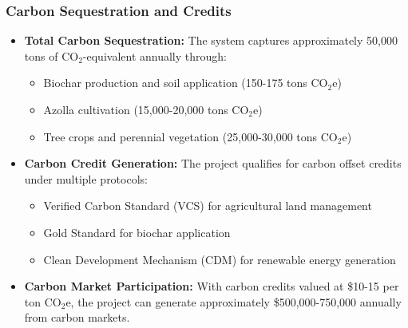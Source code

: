 \subsubsection{Carbon Sequestration and Credits}
\begin{itemize}
    \item \textbf{Total Carbon Sequestration:} The system captures approximately 50,000 tons of CO$_2$-equivalent annually through:
    \begin{itemize}
        \item Biochar production and soil application (150-175 tons CO$_2$e)
        \item Azolla cultivation (15,000-20,000 tons CO$_2$e)
        \item Tree crops and perennial vegetation (25,000-30,000 tons CO$_2$e)
    \end{itemize}
    
    \item \textbf{Carbon Credit Generation:} The project qualifies for carbon offset credits under multiple protocols:
    \begin{itemize}
        \item Verified Carbon Standard (VCS) for agricultural land management
        \item Gold Standard for biochar application
        \item Clean Development Mechanism (CDM) for renewable energy generation
    \end{itemize}
    
    \item \textbf{Carbon Market Participation:} With carbon credits valued at \$10-15 per ton CO$_2$e, the project can generate approximately \$500,000-750,000 annually from carbon markets.
\end{itemize}

